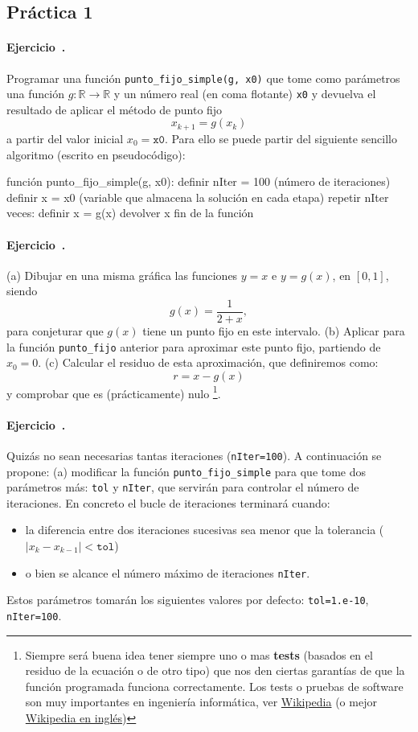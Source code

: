 \documentclass[12pt]{article}
\newcommand{\Rset}{\mathbb{R}}
\newcommand{\practica}[1]{\subsection*{#1}}
\newcounter{ejercicio}
\newcommand{\ejercicio}{\stepcounter{ejercicio}\paragraph*{Ejercicio~\theejercicio.}}
\begin{document}
\practica{Práctica 1}
\ejercicio
Programar una función \texttt{punto\_fijo\_simple(g, x0)} que tome como parámetros una función $g:\Rset \to \Rset$ y un número real (en coma flotante) \texttt{x0} y devuelva el resultado de aplicar el método de punto fijo 
$$x_{k+1} = g(x_k)$$ a 
partir del valor inicial $x_0=\texttt{x0}$. Para ello se puede partir del siguiente sencillo algoritmo (escrito en pseudocódigo):
\begin{algorithm}
función punto_fijo_simple(g, x0):
  definir nIter = 100  (número de iteraciones) 
  definir x = x0  (variable que almacena la solución en cada etapa)
  repetir nIter veces:
    definir x = g(x)
  devolver x
fin de la función
\end{algorithm}

\ejercicio
(a) Dibujar en una misma gráfica las funciones $y=x$ e $y=g(x)$, en $[0,1]$, siendo 
\begin{equation}
  \label{eq.g}
g(x)=\frac{1}{2+x},
\end{equation} 
para conjeturar que $g(x)$ tiene un punto fijo en este intervalo.
(b) Aplicar para la función \texttt{punto\_fijo} anterior para aproximar este punto fijo, partiendo de $x_0=0$. (c) Calcular el residuo de esta aproximación, que definiremos como:
$$r= x - g(x)$$
y comprobar que es (prácticamente) nulo%
\footnote{Siempre será buena idea tener siempre uno o mas \textbf{tests} (basados en el residuo de la ecuación o de otro tipo) que nos den ciertas garantías de que la función programada funciona correctamente. Los tests o pruebas de software son muy importantes en ingeniería informática, ver \href{https://es.wikipedia.org/wiki/Pruebas_de_software}{Wikipedia} (o mejor \href{https://es.wikipedia.org/wiki/Pruebas_de_software}{Wikipedia en inglés})}.

\ejercicio
Quizás no sean necesarias tantas iteraciones (\texttt{nIter=100}). A continuación se propone: (a) modificar la función \verb|punto_fijo_simple| para que tome dos parámetros más: \texttt{tol} y \texttt{nIter}, que servirán para controlar el número de iteraciones. En concreto el bucle de iteraciones terminará cuando:
\begin{itemize}
  \item la diferencia entre dos iteraciones sucesivas sea menor que la tolerancia ($|x_{k}-x_{k-1}|<\texttt{tol}$)
  \item o bien se alcance el número máximo de iteraciones \texttt{nIter}. 
\end{itemize}
Estos parámetros tomarán los siguientes valores por defecto: 
\texttt{tol=1.e-10}, \texttt{nIter=100}.
\end{document}
